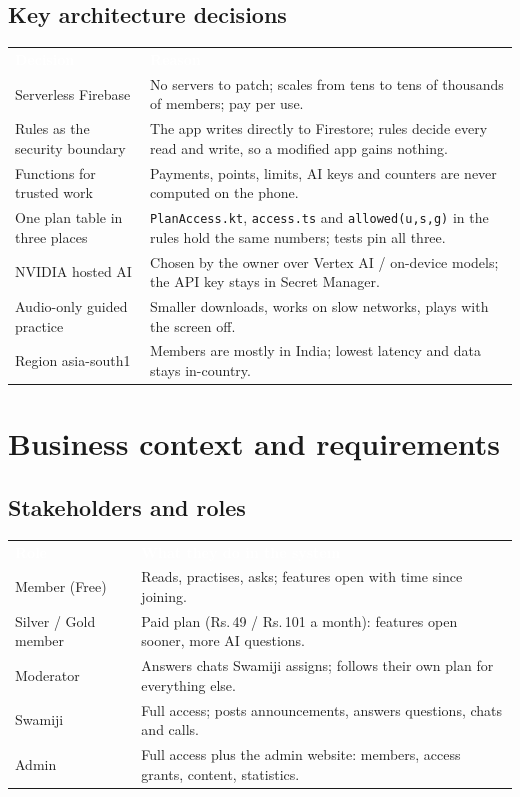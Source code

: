 \documentclass[11pt,a4paper,oneside]{report}
\newcommand{\thead}[1]{\textcolor{white}{\bfseries #1}}
\newcommand{\headrow}{\rowcolor{ojDeep}}
\begin{document}
\section{Key architecture decisions}
\begin{tabularx}{\textwidth}{@{}p{4.3cm}L@{}}
\headrow \thead{Decision} & \thead{Reason} \\
Serverless Firebase & No servers to patch; scales from tens to tens of thousands of members; pay per use. \\
Rules as the security boundary & The app writes directly to Firestore; rules decide every read and write, so a modified app gains nothing. \\
Functions for trusted work & Payments, points, limits, AI keys and counters are never computed on the phone. \\
One plan table in three places & \texttt{PlanAccess.kt}, \texttt{access.ts} and \texttt{allowed(u,s,g)} in the rules hold the same numbers; tests pin all three. \\
NVIDIA hosted AI & Chosen by the owner over Vertex AI / on-device models; the API key stays in Secret Manager. \\
Audio-only guided practice & Smaller downloads, works on slow networks, plays with the screen off. \\
Region asia-south1 & Members are mostly in India; lowest latency and data stays in-country. \\
\bottomrule
\end{tabularx}

\chapter{Business context and requirements}

\section{Stakeholders and roles}
\begin{tabularx}{\textwidth}{@{}p{3cm}L@{}}
\headrow \thead{Role} & \thead{What they do in the system} \\
Member (Free) & Reads, practises, asks; features open with time since joining. \\
Silver / Gold member & Paid plan (Rs.\,49 / Rs.\,101 a month): features open sooner, more AI questions. \\
Moderator & Answers chats Swamiji assigns; follows their own plan for everything else. \\
Swamiji & Full access; posts announcements, answers questions, chats and calls. \\
Admin & Full access plus the admin website: members, access grants, content, statistics. \\
\bottomrule
\end{tabularx}
\end{document}
